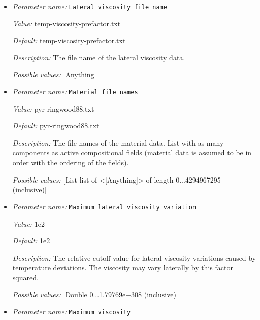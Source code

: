 \begin{itemize}
{\it Default:} false


{\it Description:} Whether to include latent heat effects in the calculation of thermal expansivity and specific heat. Following the approach of Nakagawa et al. 2009. 


{\it Possible values:} [Bool]
\item {\it Parameter name:} {\tt Lateral viscosity file name}
\label{parameters:Material model/Steinberger model/Lateral viscosity file name}


{\it Value:} temp-viscosity-prefactor.txt


{\it Default:} temp-viscosity-prefactor.txt


{\it Description:} The file name of the lateral viscosity data. 


{\it Possible values:} [Anything]
\item {\it Parameter name:} {\tt Material file names}
\label{parameters:Material model/Steinberger model/Material file names}


{\it Value:} pyr-ringwood88.txt


{\it Default:} pyr-ringwood88.txt


{\it Description:} The file names of the material data. List with as many components as active compositional fields (material data is assumed to be in order with the ordering of the fields). 


{\it Possible values:} [List list of <[Anything]> of length 0...4294967295 (inclusive)]
\item {\it Parameter name:} {\tt Maximum lateral viscosity variation}
\label{parameters:Material model/Steinberger model/Maximum lateral viscosity variation}


{\it Value:} 1e2


{\it Default:} 1e2


{\it Description:} The relative cutoff value for lateral viscosity variations caused by temperature deviations. The viscosity may vary laterally by this factor squared.


{\it Possible values:} [Double 0...1.79769e+308 (inclusive)]
\item {\it Parameter name:} {\tt Maximum viscosity}
\label{parameters:Material model/Steinberger model/Maximum viscosity}



\end{itemize}
